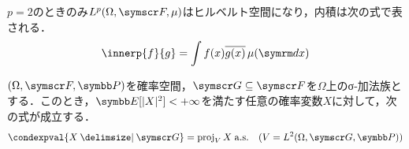\documentclass[../../main]{subfiles}
\begin{document}
\begin{proposition}{}{}
  \(p=2\)のときのみ\(\Lebesgue{p}(\Omega,\sigmaalg{F},\mu)\)はヒルベルト空間になり，内積は次の式で表される．
  \[
    \innerp{f}{g} = \int f(x)\conj*{g(x)}\measured[x]{\mu}
  \]
\end{proposition}

\begin{proposition}{}{}
  \((\Omega,\sigmaalg{F},\prob)\)を確率空間，\(\sigmaalg{G}\subseteq\sigmaalg{F}\)を\(\Omega\)上のσ‐加法族とする．このとき，\(\expval[\abs{X}^2]<+\infty\)を満たす任意の確率変数\(X\)に対して，次の式が成立する．
  \[
    \condexpval{X\given\sigmaalg{G}} = \proj_VX\almostsurely\quad(V=\Lebesgue{2}(\Omega,\sigmaalg{G},\prob))
  \]
\end{proposition}
\end{document}

